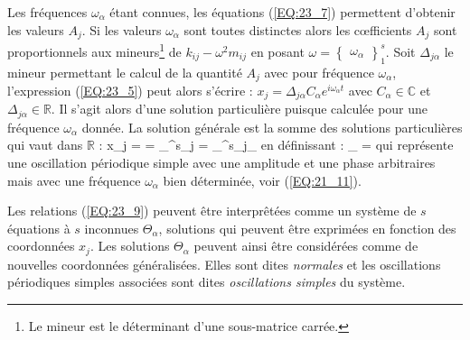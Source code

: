 Les fr\'equences $\omega_{\alpha}$ \'etant connues, les \'equations (\ref{EQ:23_7}) permettent d'obtenir les valeurs $A_{j}$. Si les valeurs $\omega_{\alpha}$ sont toutes distinctes alors les c{\oe}fficients $A_{j}$ sont proportionnels aux mineurs\footnote{Le mineur est le d\'eterminant d'une sous-matrice carr\'ee.} de $k_{ij} - \omega^{2}m_{ij}$ en posant $\omega = \begin{Bmatrix}\omega_{\alpha}\end{Bmatrix}^{s}_{1}$. Soit $\Delta_{j\alpha}$ le mineur permettant le calcul de la quantit\'e $A_{j}$ avec pour fr\'equence $\omega_{\alpha}$, l'expression (\ref{EQ:23_5}) peut alors s'\'ecrire : $x_{j} = \Delta_{j\alpha}C_{\alpha}e^{i\omega_{\alpha}t}$ avec $C_{\alpha} \in \mathbb{C}$ et $\Delta_{j\alpha} \in \mathbb{R}$. Il s'agit alors d'une solution particuli\`ere puisque calcul\'ee pour une fr\'equence $\omega_{\alpha}$ donn\'ee. La solution g\'en\'erale est la somme des solutions particuli\`eres qui vaut dans $\mathbb{R}$ :
\be
	x_{j} =  = \sum_{}^{s}\Delta_{j\alpha} = \sum_{}^{s}\Delta_{j\alpha}\Theta_{\alpha} \label{EQ:23_9}
\ee
en d\'efinissant :
\be
	\Theta_{\alpha} =  \label{EQ:23_10}
\ee
qui repr\'esente une oscillation p\'eriodique simple avec une amplitude et une phase arbitraires mais avec une fr\'equence $\omega_{\alpha}$ bien d\'etermin\'ee, voir (\ref{EQ:21_11}).

Les relations (\ref{EQ:23_9}) peuvent \^etre interpr\^et\'ees comme un syst\`eme de $s$ \'equations \`a $s$ inconnues $\Theta_{\alpha}$, solutions qui peuvent \^etre exprim\'ees en fonction des coordonn\'ees $x_{j}$. Les solutions $\Theta_{\alpha}$ peuvent ainsi \^etre consid\'er\'ees comme de nouvelles coordonn\'ees g\'en\'eralis\'ees. Elles sont dites \emph{normales} et les oscillations p\'eriodiques simples associ\'ees sont dites \emph{oscillations simples} du syst\`eme.

